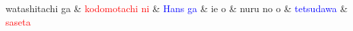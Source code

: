 \documentclass[border=2mm]{standalone}
\begin{document}
\begin{dependency}[arc edge, arc angle=80, text only label, label style={above}, hide label]
    \begin{deptext}
       watashitachi ga \& \textcolor{red}{kodomotachi ni} \& \textcolor{blue}{Hans ga} \& ie o \& nuru no o \& \textcolor{blue}{tetsudawa} \& \textcolor{red}{saseta} \\
    \end{deptext}
\end{dependency}
\end{document}
